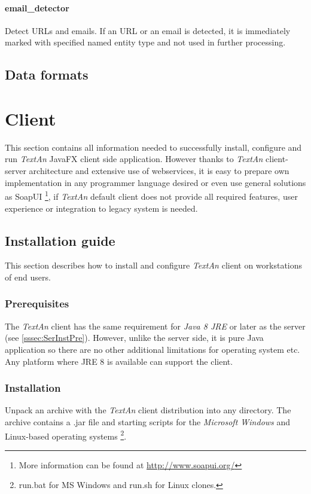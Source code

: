 \documentclass[12pt,a4paper]{report}
\newcommand{\textan}{\emph{TextAn}}
\begin{document}
\paragraph{email\_detector}
Detect URLs and emails. If an URL or an email is detected, it is immediately marked with specified named entity type and not used in further processing.

\subsection{Data formats}

\section{Client}

This section contains all information needed to successfully install, configure
and run \textan{} JavaFX client side application. However thanks to \textan{}
client-server architecture and extensive use of webservices, it is easy to
prepare own implementation in any programmer language desired or even use
general solutions as SoapUI%
\footnote{More information can be found at \url{http://www.soapui.org/}},
if \textan{} default client does not provide all required features, user
experience or integration to legacy system is needed.

\subsection{Installation guide}

This section describes how to install and configure \textan{} client on
workstations of end users.

\subsubsection{Prerequisites}

The \textan{} client has the same requirement for \emph{Java 8 JRE} or later
as the server (see \ref{sssec:SerInstPre}). However, unlike the server side,
it is pure Java application so there are no other additional limitations for
operating system etc. Any platform where JRE 8 is available can support the
client.

\subsubsection{Installation}

Unpack an archive with the \textan{} client distribution into any directory. 
The archive contains a .jar file and starting scripts for the
\emph{Microsoft Windows} and Linux-based operating systems%
\footnote{run.bat for MS Windows and run.sh for Linux clones.\label{runscript_note}}.
\end{document}
